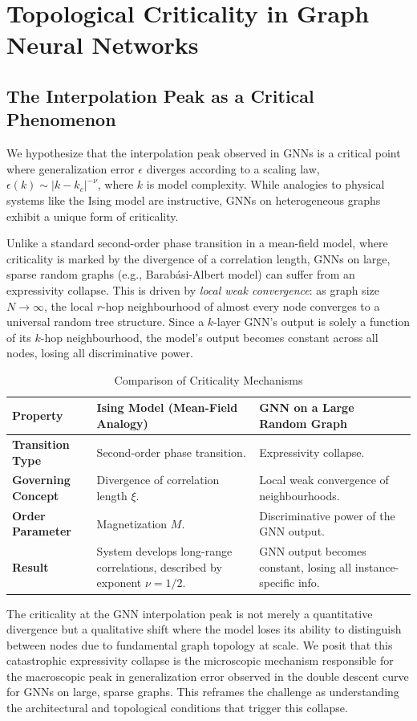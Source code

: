 \documentclass[10pt,oneside,oldfontcommands,dvipsnames,article]{memoir}
\begin{document}
\section{Topological Criticality in Graph Neural Networks}

\subsection{The Interpolation Peak as a Critical Phenomenon}
We hypothesize that the interpolation peak observed in GNNs is a critical point where generalization error $\epsilon$ diverges according to a scaling law, $\epsilon(k) \sim |k - k_c|^{-\nu}$, where $k$ is model complexity. While analogies to physical systems like the Ising model are instructive, GNNs on heterogeneous graphs exhibit a unique form of criticality.

Unlike a standard second-order phase transition in a mean-field model, where criticality is marked by the divergence of a correlation length, GNNs on large, sparse random graphs (e.g., Barabási-Albert model) can suffer from an expressivity collapse. This is driven by \textit{local weak convergence}: as graph size $N \to \infty$, the local $r$-hop neighbourhood of almost every node converges to a universal random tree structure. Since a $k$-layer GNN's output is solely a function of its $k$-hop neighbourhood, the model's output becomes constant across all nodes, losing all discriminative power.

\begin{table}[h!]
\centering
\small
\caption{Comparison of Criticality Mechanisms}
\begin{tabular}{|p{3cm}|p{5cm}|p{5cm}|}
\hline
\textbf{Property} & \textbf{Ising Model (Mean-Field Analogy)} & \textbf{GNN on a Large Random Graph} \\
\hline
\textbf{Transition Type} & Second-order phase transition. & Expressivity collapse. \\
\hline
\textbf{Governing Concept} & Divergence of correlation length $\xi$. & Local weak convergence of neighbourhoods. \\
\hline
\textbf{Order Parameter} & Magnetization $M$. & Discriminative power of the GNN output. \\
\hline
\textbf{Result} & System develops long-range correlations, described by exponent $\nu=1/2$. & GNN output becomes constant, losing all instance-specific info. \\
\hline
\end{tabular}
\end{table}
The criticality at the GNN interpolation peak is not merely a quantitative divergence but a qualitative shift where the model loses its ability to distinguish between nodes due to fundamental graph topology at scale. We posit that this catastrophic expressivity collapse is the microscopic mechanism responsible for the macroscopic peak in generalization error observed in the double descent curve for GNNs on large, sparse graphs. This reframes the challenge as understanding the architectural and topological conditions that trigger this collapse.
\end{document}
